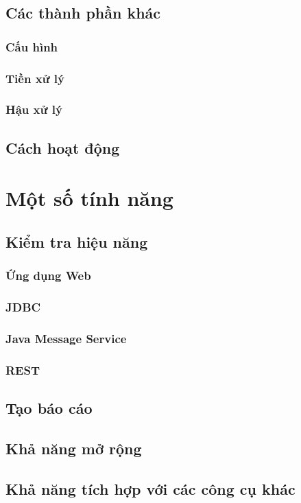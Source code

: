 \documentclass[10pt]{report}
\begin{document}
\section{Các thành phần khác}

\subsection{Cấu hình}
\subsection{Tiền xử lý}
\subsection{Hậu xử lý}

\section{Cách hoạt động}

\chapter{Một số tính năng}

\section{Kiểm tra hiệu năng}

\subsection{Ứng dụng Web}

\subsection{JDBC}

\subsection{Java Message Service}

\subsection{REST}

\section{Tạo báo cáo}

\section{Khả năng mở rộng}

\section{Khả năng tích hợp với các công cụ khác}
\end{document}
